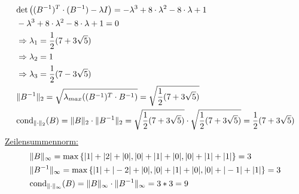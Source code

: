 \begin{align*}
\begin{split}
&\mathrm{det}\left((B^{-1})^T\cdot(B^{-1})-\lambda I \right)=-\lambda^3+8\cdot\lambda^2-8\cdot\lambda+1\\
&-\lambda^3+8\cdot\lambda^2-8\cdot\lambda+1=0\\
&\Rightarrow \lambda_{1}=\frac{1}{2}(7+3\sqrt{5})\\
&\Rightarrow\lambda_{2}=1\\
&\Rightarrow\lambda_{3}=\frac{1}{2}(7-3\sqrt{5})\\
&\|B^{-1}\|_2=\sqrt{\lambda_{max}((B^{-1})^T\cdot B^{-1})}=\sqrt{\frac{1}{2}(7+3\sqrt{5})}\\
&\mathrm{cond}_{\| \cdot \|_2}(B)=\|B\|_2\cdot\|B^{-1}\|_2=\sqrt{\frac{1}{2}(7+3\sqrt{5})}\cdot\sqrt{\frac{1}{2}(7+3\sqrt{5})}=\frac{1}{2}(7+3\sqrt{5})
\end{split}
\end{align*}
\underline{Zeilensummennorm:}
\begin{align*}
\begin{split}
&\|B\|_\infty = \mathrm{max} \left\lbrace|1|+|2|+|0|, |0|+|1|+|0|,|0|+|1|+|1|\right\rbrace = 3\\
&\|B^{-1}\|_\infty = \mathrm{max} \left\lbrace|1|+|-2|+|0|, |0|+|1|+|0|,|0|+|-1|+|1|\right\rbrace = 3\\
&\mathrm{cond}_{\| \cdot \|_\infty}(B)=\|B\|_\infty\cdot\|B^{-1}\|_\infty = 3 * 3 = 9\\
\end{split}
\end{align*}